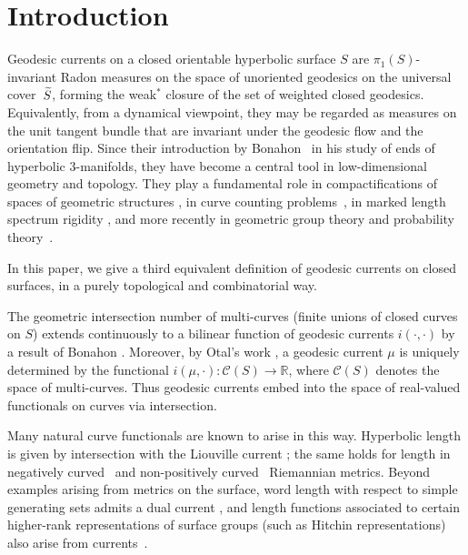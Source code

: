 \section{Introduction}

Geodesic currents on a closed orientable hyperbolic surface $S$ are $\pi_1(S)$-invariant
Radon measures on the
space of unoriented geodesics on the universal cover~$\widetilde{S}$, forming the weak$^*$
closure of the set
of weighted closed geodesics. Equivalently, from a dynamical
viewpoint, they may be regarded as measures on the unit tangent bundle
that are invariant under the geodesic flow and the orientation flip.
Since their introduction by Bonahon~\cite{Bonahon86:EndsHyperbolicManifolds}
in his study of ends of hyperbolic $3$-manifolds, they have become a
central tool in low-dimensional geometry and topology. They play a
fundamental role in compactifications of spaces of geometric
structures \cite{Bonahon88:GeodesicCurrent, DLR10:DegenerationFlatMetrics,
MZ19:PositivelyRatioed,BIPP24:PositiveCrossratios}, in curve counting
problems~\cite{RS19:CountingProblems, EPS20:CountingCurves,
ES22:GeodesicCount}, in marked length spectrum
rigidity \cite{Otal90:SpectreMarqueNegative, CFF92:RigidityNonPosCurvedRiem,
HP97:RigidityNegCurvedCone, Con18:MarkedNonpos}, and more recently in
geometric group theory \cite{HV24:Biautomaticity, CR25:Manhattan, CMGR26:GreenMetrics} and probability theory~\cite{KS26:Singularity}.

In this paper, we give a third equivalent definition of geodesic
currents on closed surfaces, in a purely topological and combinatorial way.

The geometric intersection number of multi-curves (finite unions of
closed curves on $S$) extends continuously to a bilinear function of
geodesic currents $i(\cdot, \cdot)$ by a result of
Bonahon \cite[Proposition~4.5]{Bonahon86:EndsHyperbolicManifolds}.
Moreover, by Otal's work
\cite[Th\'eor\`eme~2]{Otal90:SpectreMarqueNegative}, a geodesic
current $\mu$ is uniquely determined by the functional $i(\mu,\cdot)
\colon \mathcal{C}(S) \to \mathbb{R}$, where $\mathcal C(S)$ denotes
the space of multi-curves. Thus geodesic currents embed into the space
of real-valued functionals on curves via intersection.

Many natural curve functionals are known to arise in this way. Hyperbolic length
is given by intersection with the Liouville
current \cite[Theorem~10]{Bonahon88:GeodesicCurrent}; the same holds
for length in  negatively curved~\cite{Otal90:SpectreMarqueNegative}
and non-positively
curved~\cite{CFF92:RigidityNonPosCurvedRiem} Riemannian metrics.
Beyond examples arising from metrics on the
surface, word length with respect to simple generating sets admits a
dual current \cite[Theorem~1.2]{Erlandsson:WordLength}, and length
functions associated to certain higher-rank representations of surface
groups (such as Hitchin representations) also arise from
currents~\cite{MZ19:PositivelyRatioed,BIPP24:PositiveCrossratios}.

